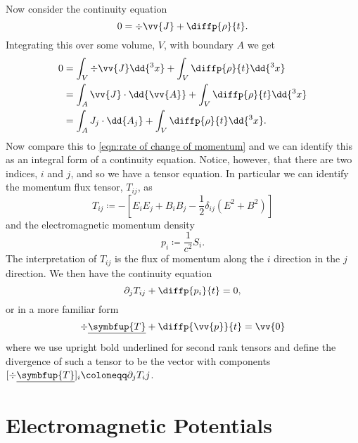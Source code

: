 Now consider the continuity equation
\begin{equation}
    0 = \div\vv{J} + \diffp{\rho}{t}.
\end{equation}
Integrating this over some volume, \(V\), with boundary \(A\) we get
\begin{align}
    0 &= \int_V \div\vv{J} \dd{^3x} + \int_V \diffp{\rho}{t} \dd{^3x}\\
    &= \int_A \vv{J} \cdot \dd{\vv{A}} + \int_V \diffp{\rho}{t} \dd{^3x}\\
    &= \int_A J_j \cdot \dd{A_j} + \int_V \diffp{\rho}{t} \dd{^3x}.
\end{align}
Now compare this to \cref{eqn:rate of change of momentum} and we can identify this as an integral form of a continuity equation.
Notice, however, that there are two indices, \(i\) and \(j\), and so we have a tensor equation.
In particular we can identify the momentum flux tensor, \(T_{ij}\), as
\begin{equation}
    T_{ij} \coloneqq  -\left[ E_iE_j + B_iB_j - \frac{1}{2}\delta_{ij}(E^2 + B^2) \right]
\end{equation}
and the electromagnetic momentum density
\begin{equation}
    p_i \coloneqq \frac{1}{c^2} S_i.
\end{equation}
The interpretation of \(T_{ij}\) is the flux of momentum along the \(i\) direction in the \(j\) direction.
We then have the continuity equation
\begin{equation}
    \partial_jT_{ij} + \diffp{p_i}{t} = 0,
\end{equation}
or in a more familiar form
\begin{equation}
    \div\underline{\symbfup{T}} + \diffp{\vv{p}}{t} = \vv{0}
\end{equation}
where we use upright bold underlined for second rank tensors and define the divergence of such a tensor to be the vector with components \([\div\underline{\symbfup{T}}]_i \coloneqq \partial_j T_ij \).


\section{Electromagnetic Potentials}
